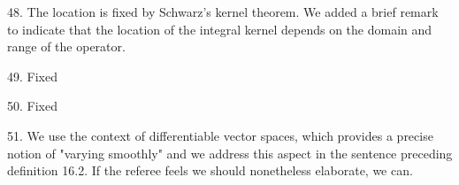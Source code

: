 \documentclass[10pt]{amsart}
\begin{document}
48. The location is fixed by Schwarz's kernel theorem. We added a brief remark to indicate that the location of the integral kernel depends on the domain and range of the operator.

49. Fixed

50. Fixed

51. We use the context of differentiable vector spaces, which provides a precise notion of "varying smoothly" and we address this aspect in the sentence preceding definition 16.2. If the referee feels we should nonetheless elaborate, we can.
\end{document}
